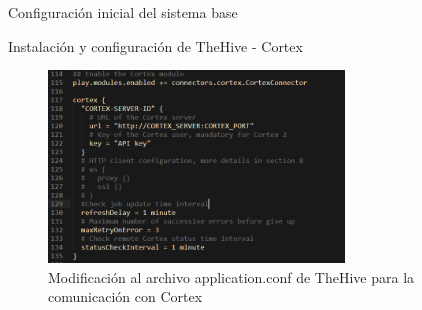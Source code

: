 \begin{section}{Configuración inicial del sistema base}
\begin{subsection}{Instalación y configuración de TheHive - Cortex}
        \begin{figure}[H]
            \centering
            \includegraphics[width=0.7\textwidth]{./iteracion_2_imagenes/figura_40_thehive_cortex_conf.png}
            \caption{Modificación al archivo application.conf de TheHive para la comunicación con Cortex}
            \label{fig:figura_40_thehive_cortex_conf}
        \end{figure}
        \end{subsection}
        
    \end{section}
   
